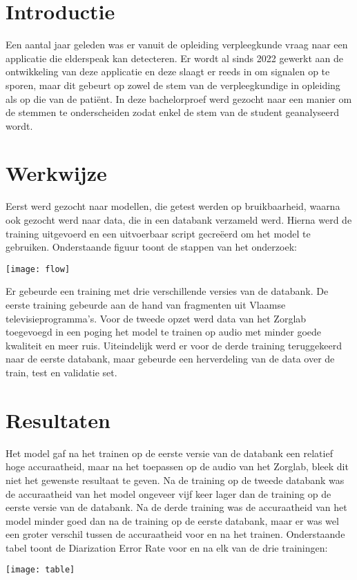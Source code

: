 \documentclass[a0,portrait]{hogent-poster}
\begin{document}
\begin{multicols}{2} %

\section{Introductie}

Een aantal jaar geleden was er vanuit de opleiding verpleegkunde vraag naar een applicatie die elderspeak kan detecteren. Er wordt al sinds 2022 gewerkt aan de ontwikkeling van deze applicatie en deze slaagt er reeds in om signalen op te sporen, maar dit gebeurt op zowel de stem van de verpleegkundige in opleiding als op die van de patiënt. In deze bachelorproef werd gezocht naar een manier om de stemmen te onderscheiden zodat enkel de stem van de student geanalyseerd wordt.

\section{Werkwijze}

Eerst werd gezocht naar modellen, die getest werden op bruikbaarheid, waarna ook gezocht werd naar data, die in een databank verzameld werd. Hierna werd de training uitgevoerd en een uitvoerbaar script gecreëerd om het model te gebruiken. Onderstaande figuur toont de stappen van het onderzoek:
\begin{center}
    \captionsetup{type=figure}
    \texttt{[image: flow]}
\end{center}
Er gebeurde een training met drie verschillende versies van de databank. De eerste training gebeurde aan de hand van fragmenten uit Vlaamse televisieprogramma's. Voor de tweede opzet werd data van het Zorglab toegevoegd in een poging het model te trainen op audio met minder goede kwaliteit en meer ruis. Uiteindelijk werd er voor de derde training teruggekeerd naar de eerste databank, maar gebeurde een herverdeling van de data over de train, test en validatie set.

\section{Resultaten}

Het model gaf na het trainen op de eerste versie van de databank een relatief hoge accuraatheid, maar na het toepassen op de audio van het Zorglab, bleek dit niet het gewenste resultaat te geven. Na de training op de tweede databank was de accuraatheid van het model ongeveer vijf keer lager dan de training op de eerste versie van de databank. Na de derde training was de accuraatheid van het model minder goed dan na de training op de eerste databank, maar er was wel een groter verschil tussen de accuraatheid voor en na het trainen. Onderstaande tabel toont de Diarization Error Rate voor en na elk van de drie trainingen:
\begin{center}
    \captionsetup{type=figure}
    \texttt{[image: table]}
\end{center}
    

\end{multicols}
\end{document}
